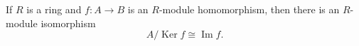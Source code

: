 If $R$ is a ring and $f: A \to B$ is an $R$-module homomorphism, then there is an $R$-module isomorphism
\[
A/\operatorname{Ker} f \cong \operatorname{Im} f.
\]